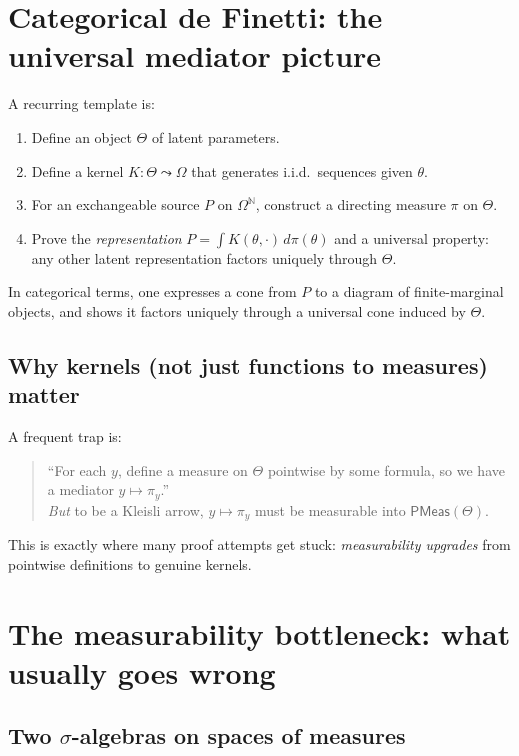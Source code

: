 \documentclass[11pt]{article}
\newcommand{\NN}{\mathbb{N}}
\newcommand{\ProbMeas}{\mathsf{PMeas}}
\begin{document}
\section{Categorical de Finetti: the universal mediator picture}

A recurring template is:

\begin{enumerate}[label=\arabic*.]
\item Define an object $\Theta$ of latent parameters.
\item Define a kernel $K : \Theta \leadsto \Omega$ that generates i.i.d.\ sequences given $\theta$.
\item For an exchangeable source $P$ on $\Omega^\NN$, construct a directing measure $\pi$ on $\Theta$.
\item Prove the \emph{representation} $P = \int K(\theta,\cdot)\,d\pi(\theta)$ and a universal property:
any other latent representation factors uniquely through $\Theta$.
\end{enumerate}

In categorical terms, one expresses a cone from $P$ to a diagram of finite-marginal objects, and shows
it factors uniquely through a universal cone induced by $\Theta$.

\subsection{Why kernels (not just functions to measures) matter}

A frequent trap is:

\begin{quote}
``For each $y$, define a measure on $\Theta$ pointwise by some formula, so we have a mediator
$y \mapsto \pi_y$.'' \\
\emph{But} to be a Kleisli arrow, $y \mapsto \pi_y$ must be measurable into $\ProbMeas(\Theta).
$
\end{quote}

This is exactly where many proof attempts get stuck: \emph{measurability upgrades} from pointwise
definitions to genuine kernels.

\section{The measurability bottleneck: what usually goes wrong}

\subsection{Two $\sigma$-algebras on spaces of measures}
\end{document}
